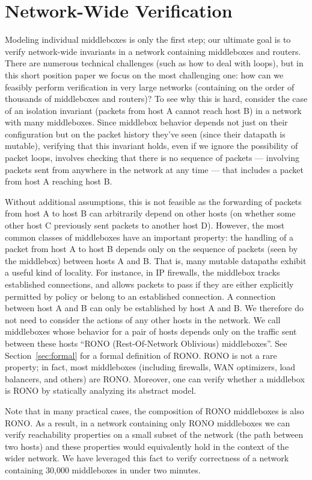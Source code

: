\section{Network-Wide Verification}
\label{sec:modelnet}

Modeling individual middleboxes is only the first step; our ultimate goal is to verify network-wide invariants in a network containing middleboxes and routers.
There are numerous technical challenges (such as how to deal with loops), but in this short position paper we focus on the most challenging one: how can we feasibly perform verification in very large networks (containing on the order of thousands of middleboxes and routers)? To see why this is hard, consider the case of an isolation invariant (packets from host A cannot reach host B) in a network with many middleboxes. Since middlebox behavior depends not just on their configuration but on the packet history they've seen (since their datapath is mutable), verifying that this invariant holds, even if we ignore the possibility of packet loops,
involves checking that there is no sequence of packets --- involving packets sent from anywhere in the network at any time --- that includes a packet from host A reaching host B.


Without additional assumptions, this is not feasible as the forwarding of packets from host A to host B can arbitrarily depend on other hosts (\eg on whether some other host C previously sent packets to another host D). However, the most common classes of middleboxes have an important property: the handling of a packet from host A to host B depends only on the sequence of packets (seen by the middlebox) between hosts A and B. That is, many mutable datapaths exhibit a useful kind of locality.
For instance, in IP
firewalls, the middlebox tracks established connections, and allows packets to pass if they are either explicitly permitted by
policy or belong to an established connection. A connection between host A and B can only be established by host A and B. We therefore do not need to consider the
actions of any other hosts in the network. We call middleboxes whose behavior for a pair of hosts depends only on the traffic sent between these hosts ``RONO (Rest-Of-Network Oblivious) middleboxes''. See Section~\ref{sec:formal} for a formal definition of RONO. RONO is not a rare property; in fact, most middleboxes (including firewalls, WAN optimizers, load balancers, and others) are RONO.  Moreover, one can verify whether a middlebox is RONO by statically analyzing its abstract model.


Note that in many practical cases, 
the composition of RONO middleboxes is also RONO.  As a result, in a network containing only RONO
middleboxes we can verify reachability properties on a small subset of the network (the path between two hosts) and these properties would equivalently hold in
the context of the wider network. We have leveraged this fact to verify correctness of a network containing 30,000 middleboxes in under two minutes.
